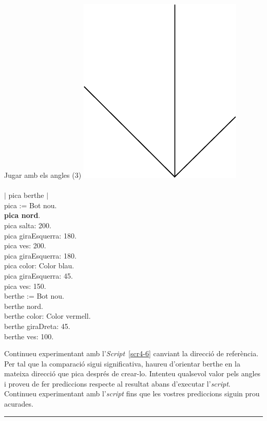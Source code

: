 \begin{script}  Jugar amb els angles (3)
\newline
\newline
\noindent
\includegraphics[scale=0.75]{Imatges/figuraS4-6.pdf} 
\noindent
\textsf{\upshape
\\
\\$|$ pica berthe $|$\\
pica := Bot nou.\\
{\bfseries pica nord}.\\
pica salta: 200.\\
pica giraEsquerra: 180.\\
pica ves: 200.\\
pica giraEsquerra: 180.\\
pica color: Color blau.\\
pica giraEsquerra: 45.\\
pica ves: 150.\\
berthe := Bot nou.\\
berthe nord.\\
berthe color: Color vermell.\\
berthe giraDreta: 45.\\
berthe ves: 100.\\
}
\label{scr4-6}
\end{script}

\begin{center}
\colorbox{black}{}
\end{center}
{\small
\noindent
Continueu experimentant amb  l'\emph{Script}~\ref{scr4-6} canviant la direcció de referència. Per tal que la comparació sigui significativa, haureu d'orientar \textsf{berthe} en la mateixa direcció que \textsf{pica} després de crear-lo. Intenteu qualsevol valor pels angles i proveu de fer prediccions respecte al resultat abans d'executar l'\emph{script}. Continueu experimentant amb l'\emph{script} fins que les vostres prediccions siguin prou acurades.}\\
\noindent
\rule{\textwidth}{3pt}
\newline


